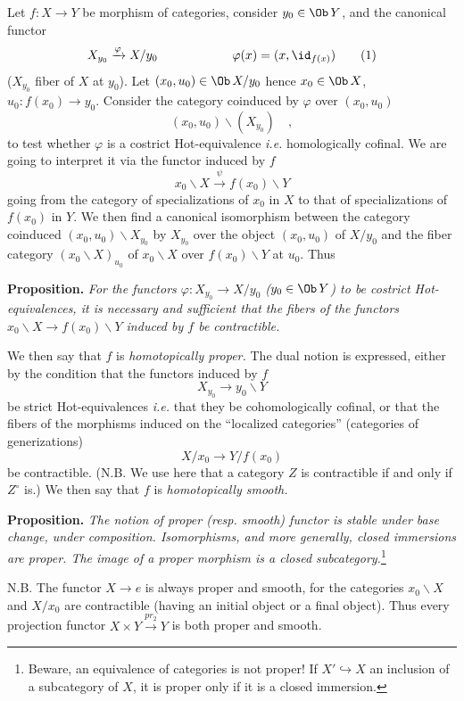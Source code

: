 \noindent Let $f : X \to Y$ be morphism of categories, consider $y_0 \in \Ob\, Y$, and the canonical functor
\[
X_{y_0} \xrightarrow{\varphi} X/y_0 \qquad\qquad\qquad \varphi(x) = (x, \id_{f(x)}) \tag*{(1)}
\]
($X_{y_0}$ fiber of $X$ at $y_0$). Let $(x_0, u_0) \in \Ob\, X/y_0$ hence $x_0 \in \Ob\, X$, $u_0 : f(x_0) \to y_0$. Consider the category coinduced by $\varphi$ over $(x_0, u_0)$
\[
(x_0, u_0)\backslash(X_{y_0}) \quad ,
\]
to test whether $\varphi$ is a costrict Hot-equivalence \textit{i.e.} homologically cofinal. We are going to interpret it via the functor induced by $f$
\[
x_0\backslash X \xrightarrow{\psi} f(x_0)\backslash Y
\]
going from the category of specializations of $x_0$ in $X$ to that of specializations of $f(x_0)$ in $Y$. We then find a canonical isomorphism between the category coinduced $(x_0, u_0)\backslash X_{y_0}$ by $X_{y_0}$ over the object $(x_0, u_0)$ of $X/y_0$ and the fiber category $(x_0\backslash X)_{u_0}$ of $x_0\backslash X$ over $f(x_0)\backslash Y$ at $u_0$. Thus

\noindent\textbf{Proposition.} \textit{For the functors $\varphi : X_{y_0} \to X/y_0$ ($y_0 \in \Ob\, Y$) to be costrict Hot-equivalences, it is necessary and sufficient that the fibers of the functors $x_0\backslash X \to f(x_0)\backslash Y$ induced by $f$ be contractible.}

\noindent{}
We then say that $f$ is \textit{homotopically proper.} The dual notion is expressed, either by the condition that the functors induced by $f$
\[
X_{y_0} \longrightarrow y_0\backslash Y
\]
be strict Hot-equivalences \textit{i.e.} that they be cohomologically cofinal, or that the fibers of the morphisms induced on the ``localized categories'' (categories of generizations)
\[
X/x_0 \longrightarrow Y/f(x_0)
\]
be contractible. (N.B. We use here that a category $Z$ is contractible if and only if $Z^\circ$ is.) We then say that $f$ is \textit{homotopically smooth.}

\noindent\textbf{Proposition.} \textit{The notion of proper (resp. smooth) functor is stable under base change, under composition. Isomorphisms, and more generally, closed immersions are proper. The image of a proper morphism is a closed subcategory.}\footnote[23]{Beware, an equivalence of categories is not proper! If $X' \hookrightarrow X$ an inclusion of a subcategory of $X$, it is proper only if it is a closed immersion.}

\noindent N.B. The functor $X \to e$ is always proper and smooth, for the categories $x_0\backslash X$ and $X/x_0$ are contractible (having an initial object or a final object). Thus every projection functor $X \times Y \xrightarrow{pr_2} Y$ is both proper and smooth.

